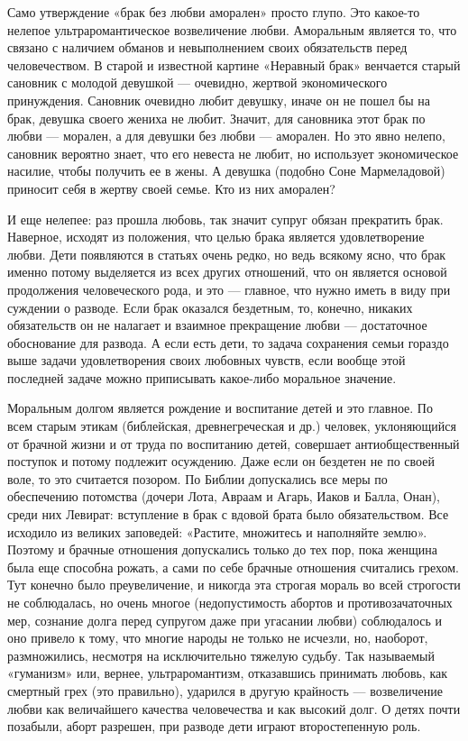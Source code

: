 Само утверждение «брак без любви аморален» просто глупо. Это какое-то
нелепое ультраромантическое возвеличение любви. Аморальным является
то, что связано с наличием обманов и невыполнением своих обязательств
перед человечеством. В старой и известной картине «Неравный брак»
венчается старый сановник с молодой девушкой --- очевидно, жертвой
экономического принуждения. Сановник очевидно любит девушку, иначе он
не пошел бы на брак, девушка своего жениха не любит. Значит, для
сановника этот брак по любви --- морален, а для девушки без любви ---
аморален. Но это явно нелепо, сановник вероятно знает, что его невеста
не любит, но использует экономическое насилие, чтобы получить ее в
жены. А девушка (подобно Соне Мармеладовой) приносит себя в жертву
своей семье. Кто из них аморален?

И еще нелепее: раз прошла любовь, так значит супруг обязан прекратить
брак. Наверное, исходят из положения, что целью брака является
удовлетворение любви. Дети появляются в статьях очень редко, но ведь
всякому ясно, что брак именно потому выделяется из всех других
отношений, что он является основой продолжения человеческого рода, и
это --- главное, что нужно иметь в виду при суждении о разводе. Если
брак оказался бездетным, то, конечно, никаких обязательств он не
налагает и взаимное прекращение любви --- достаточное обоснование для
развода. А если есть дети, то задача сохранения семьи гораздо выше
задачи удовлетворения своих любовных чувств, если вообще этой
последней задаче можно приписывать какое-либо моральное значение.

Моральным долгом является рождение и воспитание детей и это главное.
По всем старым этикам (библейская, древнегреческая и др.) человек,
уклоняющийся от брачной жизни и от труда по воспитанию детей,
совершает антиобщественный поступок и потому подлежит осуждению. Даже
если он бездетен не по своей воле, то это считается позором. По Библии
допускались все меры по обеспечению потомства (дочери Лота, Авраам и
Агарь, Иаков и Балла, Онан), среди них Левират: вступление в брак с
вдовой брата было обязательством. Все исходило из великих заповедей:
«Растите, множитесь и наполняйте землю». Поэтому и брачные отношения
допускались только до тех пор, пока женщина была еще способна рожать,
а сами по себе брачные отношения считались грехом. Тут конечно было
преувеличение, и никогда эта строгая мораль во всей строгости не
соблюдалась, но очень многое (недопустимость абортов и
противозачаточных мер, сознание долга перед супругом даже при угасании
любви) соблюдалось и оно привело к тому, что многие народы не только
не исчезли, но, наоборот, размножились, несмотря на исключительно
тяжелую судьбу. Так называемый «гуманизм» или, вернее,
ультраромантизм, отказавшись принимать любовь, как смертный грех (это
правильно), ударился в другую крайность --- возвеличение любви как
величайшего качества человечества и как высокий долг. О детях почти
позабыли, аборт разрешен, при разводе дети играют второстепенную роль.

